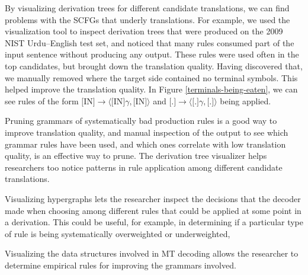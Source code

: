 \documentclass[logo]{pbml}
\begin{document}
By visualizing derivation trees for different candidate translations, we
can find problems with the SCFGs that underly translations.
For example, we used the visualization tool to inspect derivation trees that were produced on the 2009 NIST
Urdu--English test set,
and noticed that many rules consumed part of the input sentence without producing any
output.  These rules were used often in the top candidates, but brought
down the translation quality. Having discovered that, we manually removed %
where the target side contained no terminal symbols.
This helped improve the translation quality.
In Figure \ref{terminals-being-eaten}, we can see rules of the form
$\textrm{[IN]} \to \langle \textrm{[IN]}\gamma,\textrm{[IN]}\rangle$ and
$\textrm{[.]} \to \langle \textrm{[.]}\gamma, \textrm{[.]}\rangle$ being
applied.

Pruning grammars of systematically bad production rules is a good way to
improve translation quality, and manual inspection of the output to see which
grammar rules have been used, and which ones correlate with low translation
quality, is an effective way to prune.
The derivation tree visualizer helps researchers too notice patterns in rule
application among different candidate translations.

Visualizing hypergraphs lets the researcher inspect the decisions that the
decoder made when choosing among different rules that could be applied at some
point in a derivation. This could be useful, for example, in determining if
a particular type of rule is being systematically overweighted or underweighted,

Visualizing the data structures involved in MT decoding allows the researcher
to determine empirical rules for improving the grammars involved.


%
\end{document}
